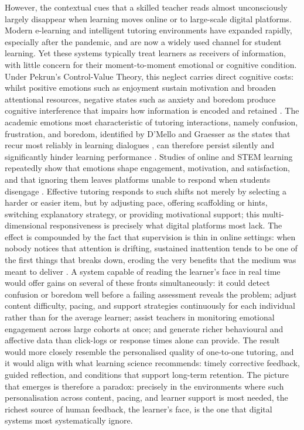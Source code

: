 However, the contextual cues that a skilled teacher reads almost unconsciously largely disappear when learning moves online or to large-scale digital platforms. Modern e-learning and intelligent tutoring environments have expanded rapidly, especially after the pandemic, and are now a widely used channel for student learning\cite{strielkowski_span_2025}. Yet these systems typically treat learners as receivers of information, with little concern for their moment-to-moment emotional or cognitive condition. Under Pekrun's Control-Value Theory, this neglect carries direct cognitive costs: whilst positive emotions such as enjoyment sustain motivation and broaden attentional resources, negative states such as anxiety and boredom produce cognitive interference that impairs how information is encoded and retained \cite{pekrun_control-value_2006}. The academic emotions most characteristic of tutoring interactions, namely confusion, frustration, and boredom, identified by D'Mello and Graesser as the states that recur most reliably in learning dialogues \cite{dmello_language_2012}, can therefore persist silently and significantly hinder learning performance \cite{gong_design_2025}. Studies of online and STEM learning repeatedly show that emotions shape engagement, motivation, and satisfaction, and that ignoring them leaves platforms unable to respond when students disengage \cite{anwar_emotions_2023}. Effective tutoring responds to such shifts not merely by selecting a harder or easier item, but by adjusting pace, offering scaffolding or hints, switching explanatory strategy, or providing motivational support; this multi-dimensional responsiveness is precisely what digital platforms most lack. The effect is compounded by the fact that supervision is thin in online settings: when nobody notices that attention is drifting, sustained inattention tends to be one of the first things that breaks down, eroding the very benefits that the medium was meant to deliver \cite{gupta_edfa_2023,aly_enhancing_2023}. A system capable of reading the learner's face in real time would offer gains on several of these fronts simultaneously: it could detect confusion or boredom well before a failing assessment reveals the problem; adjust content difficulty, pacing, and support strategies continuously for each individual rather than for the average learner; assist teachers in monitoring emotional engagement across large cohorts at once; and generate richer behavioural and affective data than click-logs or response times alone can provide. The result would more closely resemble the personalised quality of one-to-one tutoring, and it would align with what learning science recommends: timely corrective feedback, guided reflection, and conditions that support long-term retention. The picture that emerges is therefore a paradox: precisely in the environments where such personalisation across content, pacing, and learner support is most needed, the richest source of human feedback, the learner's face, is the one that digital systems most systematically ignore.

